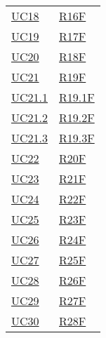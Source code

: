 \begin{center}
\begin{longtable}[!h]{m{50px} m{50px}}
        \hyperref[sec:UC18]{UC18}         & \hyperref[tab:RequisitiFunzionali]{R16F}    \\

        \hyperref[sec:UC19]{UC19}         & \hyperref[tab:RequisitiFunzionali]{R17F}    \\

        \hyperref[sec:UC20]{UC20}         & \hyperref[tab:RequisitiFunzionali]{R18F}    \\

        \hyperref[sec:UC21]{UC21}         & \hyperref[tab:RequisitiFunzionali]{R19F}    \\

        \hyperref[sec:UC21.1]{UC21.1}     & \hyperref[tab:RequisitiFunzionali]{R19.1F}  \\

        \hyperref[sec:UC21.2]{UC21.2}     & \hyperref[tab:RequisitiFunzionali]{R19.2F}  \\

        \hyperref[sec:UC21.3]{UC21.3}     & \hyperref[tab:RequisitiFunzionali]{R19.3F}  \\

        \hyperref[sec:UC22]{UC22}         & \hyperref[tab:RequisitiFunzionali]{R20F}    \\

        \hyperref[sec:UC23]{UC23}         & \hyperref[tab:RequisitiFunzionali]{R21F}    \\

        \hyperref[sec:UC24]{UC24}         & \hyperref[tab:RequisitiFunzionali]{R22F}    \\

        \hyperref[sec:UC25]{UC25}         & \hyperref[tab:RequisitiFunzionali]{R23F}    \\

        \hyperref[sec:UC26]{UC26}         & \hyperref[tab:RequisitiFunzionali]{R24F}    \\

        \hyperref[sec:UC27]{UC27}         & \hyperref[tab:RequisitiFunzionali]{R25F}    \\

        \hyperref[sec:UC28]{UC28}         & \hyperref[tab:RequisitiFunzionali]{R26F}    \\

        \hyperref[sec:UC29]{UC29}         & \hyperref[tab:RequisitiFunzionali]{R27F}    \\

        \hyperref[sec:UC30]{UC30}         & \hyperref[tab:RequisitiFunzionali]{R28F}    \\


\end{longtable}
\end{center}
